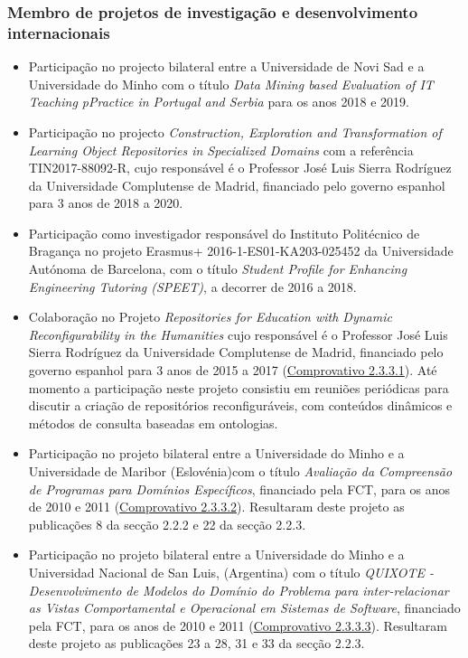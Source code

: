 \documentclass[11pt]{article}
\begin{document}
\subsubsection{Membro de projetos de investigação e desenvolvimento internacionais}
\begin{itemize}


\item {Participação no projecto bilateral entre a Universidade de Novi Sad e a Universidade do Minho com o título {\em{ Data Mining based Evaluation of IT Teaching pPractice in Portugal and Serbia}} para os anos 2018 e 2019.}
\item {Participação no projecto {\em{ Construction, Exploration and Transformation of Learning Object Repositories in Specialized Domains}} com a referência TIN2017-88092-R, cujo responsável é o Professor José Luis Sierra Rodríguez da Universidade Complutense de Madrid, financiado pelo governo espanhol para 3 anos de 2018 a 2020. }
\item {Participação como investigador responsável do Instituto Politécnico de Bragança no projeto Erasmus+ 2016-1-ES01-KA203-025452 da Universidade Autónoma de Barcelona, com o título {\em{ Student Profile for Enhancing Engineering Tutoring (SPEET)}}, a decorrer de 2016 a 2018.}
\item {Colaboração no Projeto {\em{ Repositories for Education with Dynamic Reconfigurability in the Humanities}} cujo responsável é o Professor José Luis Sierra Rodríguez da Universidade Complutense de Madrid, financiado pelo governo espanhol para 3 anos de 2015 a 2017 (\href{run:Projectos/Memoria.pdf}{Comprovativo 2.3.3.1}).
Até momento a participação neste projeto consistiu em reuniões periódicas para discutir a criação de repositórios reconfiguráveis, com conteúdos dinâmicos e métodos de consulta baseadas em ontologias.}
\item {Participação no projeto bilateral entre a Universidade do Minho e a Universidade de Maribor (Eslovénia)com o título {\em{ Avaliação da Compreensão de Programas para Domínios Específicos}}, financiado pela FCT, para os anos de 2010 e 2011 (\href{run:Projectos/eslov20102011.pdf}{Comprovativo 2.3.3.2}). Resultaram deste projeto as publicações 8 da secção 2.2.2 e 22 da secção 2.2.3.}
\item {Participação no projeto bilateral entre a Universidade do Minho e a Universidad Nacional de San Luis, (Argentina) com o título {\em{ QUIXOTE - Desenvolvimento de Modelos do Domínio do Problema para inter-relacionar as Vistas Comportamental e Operacional em Sistemas de Software}}, financiado pela FCT, para os anos de 2010 e 2011 (\href{run:Projectos/Quixote.pdf}{Comprovativo 2.3.3.3}). Resultaram deste projeto as publicações 23 a 28, 31 e 33 da secção 2.2.3.}

\end{itemize}
\end{document}
